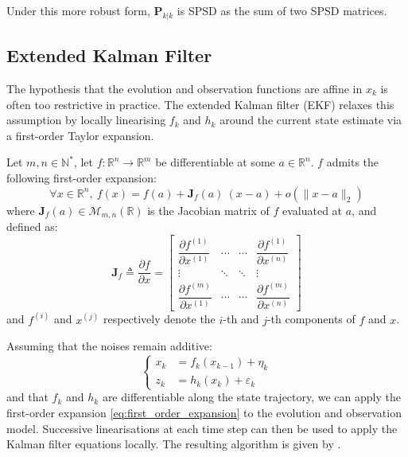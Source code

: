 Under this more robust form, $\mathbf{P}_{k|k}$ is SPSD as the sum of two SPSD matrices.

\subsection{Extended Kalman Filter}

The hypothesis that the evolution and observation functions are affine in $x_k$ is often too restrictive in practice. The extended Kalman filter (EKF) \cite{bib:EKF} relaxes this assumption by locally linearising $f_k$ and $h_k$ around the current state estimate via a first-order Taylor expansion.

Let $m,n\in\mathbb{N}^*$, let $f:\mathbb{R}^n\to\mathbb{R}^m$ be differentiable at some $a\in\mathbb{R}^n$. $f$ admits the following first-order expansion:
\begin{equation}
	\forall x\in\mathbb{R}^n,\:f(x)=f(a)+\mathbf{J}_f(a)\:(x-a)+o(\|x-a\|_2)\label{eq:first_order_expansion}
\end{equation}
where $\mathbf{J}_f(a)\in\mathcal{M}_{m,n}(\mathbb{R})$ is the Jacobian matrix of $f$ evaluated at $a$, and defined as:
\begin{equation}
	\mathbf{J}_f\triangleq\frac{\partial f}{\partial x}=\begin{bmatrix}
	\dfrac{\partial f^{(1)}}{\partial x^{(1)}}&\cdots&\cdots&\dfrac{\partial f^{(1)}}{\partial x^{(n)}}\\
	\vdots&\ddots&\ddots&\vdots\\
	\dfrac{\partial f^{(m)}}{\partial x^{(1)}}&\cdots&\cdots&\dfrac{\partial f^{(m)}}{\partial x^{(n)}}
	\end{bmatrix}
\end{equation}
and $f^{(i)}$ and $x^{(j)}$ respectively denote the $i$-th and $j$-th components of $f$ and $x$.

Assuming that the noises remain additive:
\begin{equation}
	\left\{\begin{aligned}
	x_k&=f_k(x_{k-1})+\eta_k\\
	z_k&=h_k(x_k)+\varepsilon_k
	\end{aligned}\right.
\end{equation}
and that $f_k$ and $h_k$ are differentiable along the state trajectory, we can apply the first-order expansion \eqref{eq:first_order_expansion} to the evolution and observation model. Successive linearisations at each time step can then be used to apply the Kalman filter equations locally. The resulting algorithm is given by .

